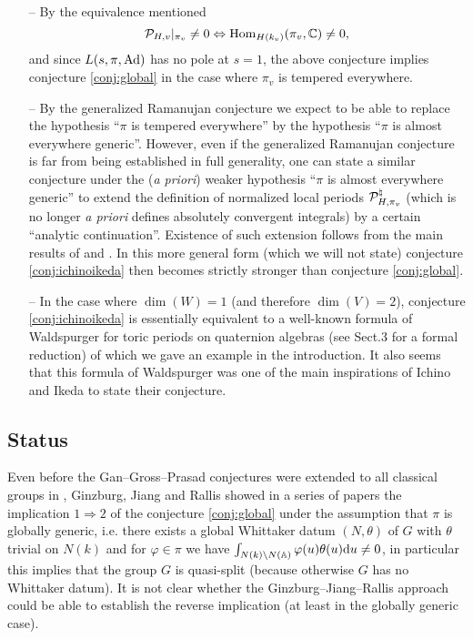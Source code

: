 \begin{remark}
\begin{itemize}
    \item[--] By the equivalence mentioned
    \[
        \mathcal{P}_{H, v}|_{\pi_v} \neq 0 \Leftrightarrow \mathrm{Hom}_{H(k_v)}(\pi_v, \mathbb{C}) \neq 0,
    \]
    and since $L(s, \pi, \mathrm{Ad})$ has no pole at $s = 1$, the above conjecture implies conjecture \ref{conj:global} in the case where $\pi_v$ is tempered everywhere.
    \item[--] By the generalized Ramanujan conjecture we expect to be able to replace the hypothesis ``$\pi$ is tempered everywhere'' by the hypothesis ``$\pi$ is almost everywhere generic''.
    However, even if the generalized Ramanujan conjecture is far from being established in full generality, one can state a similar conjecture under the (\emph{a priori}) weaker hypothesis ``$\pi$ is almost everywhere generic'' to extend the definition of normalized local periods $\mathcal{P}_{H, \pi_v}^\natural$ (which is no longer \emph{a priori} defines absolutely convergent integrals) by a certain ``analytic continuation''.
    Existence of such extension follows from the main results of \cite{beuzart2021comparison} and \cite{beuzart2017factorisations}.
    In this more general form (which we will not state) conjecture \ref{conj:ichinoikeda} then becomes strictly stronger than conjecture \ref{conj:global}.
    \item[--] In the case where $\dim(W) = 1$ (and therefore $\dim(V) = 2$), conjecture \ref{conj:ichinoikeda} is essentially equivalent to a well-known formula of Waldspurger \cite{waldspurger1985valeurs} for toric periods on quaternion algebras (see \cite{harris2014refined} Sect.3 for a formal reduction) of which we gave an example in the introduction.
    It also seems that this formula of Waldspurger was one of the main inspirations of Ichino and Ikeda to state their conjecture.
\end{itemize}
\end{remark}

\subsection{Status}



Even before the Gan--Gross--Prasad conjectures were extended to all classical groups in \cite{gan2011symplectic}, Ginzburg, Jiang and Rallis showed in a series of papers \cite{ginzburg488models,ginzburg2004nonvanishing,ginzburg2005nonvanishing} the implication $1 \Rightarrow 2$ of the conjecture \ref{conj:global} under the assumption that $\pi$ is globally generic, i.e. there exists a global Whittaker datum $(N, \theta)$ of $G$ with $\theta$ trivial on $N(k)$ and for $\varphi \in \pi$ we have $\int_{N(k) \backslash N(\mathbb{A})} \varphi(u) \theta(u) \mathrm{d} u \neq 0$, in particular this implies that the group $G$ is quasi-split (because otherwise $G$ has no Whittaker datum).
It is not clear whether the Ginzburg--Jiang--Rallis approach could be able to establish the reverse implication (at least in the globally generic case).

